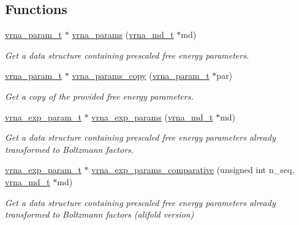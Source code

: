 \subsection*{Functions}
\begin{DoxyCompactItemize}
\item 
\hyperlink{group__energy__parameters_ga8a69ca7d787e4fd6079914f5343a1f35}{vrna\+\_\+param\+\_\+t} $\ast$ \hyperlink{group__energy__parameters_gad0e3e7e74bdc50d1709d40c92993185e}{vrna\+\_\+params} (\hyperlink{group__model__details_ga1f8a10e12a0a1915f2a4eff0b28ea17c}{vrna\+\_\+md\+\_\+t} $\ast$md)
\begin{DoxyCompactList}\small\item\em Get a data structure containing prescaled free energy parameters. \end{DoxyCompactList}\item 
\hyperlink{group__energy__parameters_ga8a69ca7d787e4fd6079914f5343a1f35}{vrna\+\_\+param\+\_\+t} $\ast$ \hyperlink{group__energy__parameters_ga4bffa39f26e7746148444dd8a8426eca}{vrna\+\_\+params\+\_\+copy} (\hyperlink{group__energy__parameters_ga8a69ca7d787e4fd6079914f5343a1f35}{vrna\+\_\+param\+\_\+t} $\ast$par)
\begin{DoxyCompactList}\small\item\em Get a copy of the provided free energy parameters. \end{DoxyCompactList}\item 
\hyperlink{group__energy__parameters_ga01d8b92fe734df8d79a6169482c7d8d8}{vrna\+\_\+exp\+\_\+param\+\_\+t} $\ast$ \hyperlink{group__energy__parameters_gab1f3016f96aa96bff020cdd904605afa}{vrna\+\_\+exp\+\_\+params} (\hyperlink{group__model__details_ga1f8a10e12a0a1915f2a4eff0b28ea17c}{vrna\+\_\+md\+\_\+t} $\ast$md)
\begin{DoxyCompactList}\small\item\em Get a data structure containing prescaled free energy parameters already transformed to Boltzmann factors. \end{DoxyCompactList}\item 
\hyperlink{group__energy__parameters_ga01d8b92fe734df8d79a6169482c7d8d8}{vrna\+\_\+exp\+\_\+param\+\_\+t} $\ast$ \hyperlink{group__energy__parameters_gaf78c09e685e6eef4100b1a41d4042550}{vrna\+\_\+exp\+\_\+params\+\_\+comparative} (unsigned int n\+\_\+seq, \hyperlink{group__model__details_ga1f8a10e12a0a1915f2a4eff0b28ea17c}{vrna\+\_\+md\+\_\+t} $\ast$md)
\begin{DoxyCompactList}\small\item\em Get a data structure containing prescaled free energy parameters already transformed to Boltzmann factors (alifold version) \end{DoxyCompactList}\item 

\end{DoxyCompactItemize}
